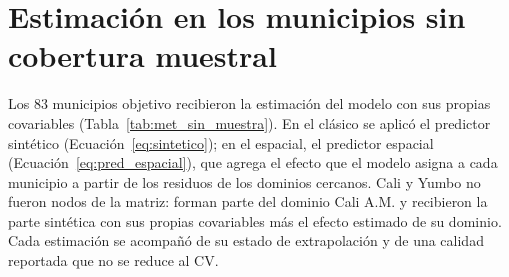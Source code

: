 \section{Estimación en los municipios sin cobertura muestral}
\label{sec:met_sin_muestra}

Los 83 municipios objetivo recibieron la estimación del modelo con sus propias covariables (Tabla~\ref{tab:met_sin_muestra}). En el clásico se aplicó el predictor sintético (Ecuación~\ref{eq:sintetico}); en el espacial, el predictor espacial (Ecuación~\ref{eq:pred_espacial}), que agrega el efecto que el modelo asigna a cada municipio a partir de los residuos de los dominios cercanos. Cali y Yumbo no fueron nodos de la matriz: forman parte del dominio Cali A.M. y recibieron la parte sintética con sus propias covariables más el efecto estimado de su dominio. Cada estimación se acompañó de su estado de extrapolación y de una calidad reportada que no se reduce al CV.

